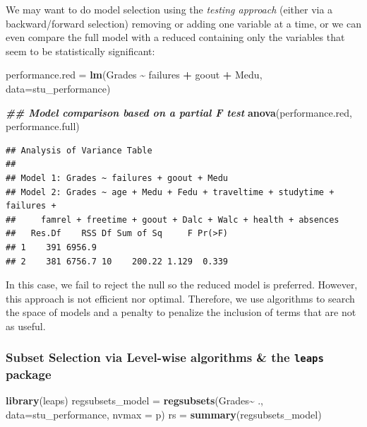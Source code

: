 \documentclass[
]{book}
\newenvironment{Shaded}{\begin{snugshade}}{\end{snugshade}}
\newcommand{\AttributeTok}[1]{\textcolor[rgb]{0.13,0.29,0.53}{#1}}
\newcommand{\DocumentationTok}[1]{\textcolor[rgb]{0.56,0.35,0.01}{\textbf{\textit{#1}}}}
\newcommand{\FunctionTok}[1]{\textcolor[rgb]{0.13,0.29,0.53}{\textbf{#1}}}
\newcommand{\NormalTok}[1]{#1}
\newcommand{\OtherTok}[1]{\textcolor[rgb]{0.56,0.35,0.01}{#1}}
\newcommand{\SpecialCharTok}[1]{\textcolor[rgb]{0.81,0.36,0.00}{\textbf{#1}}}
\begin{document}
We may want to do model selection using the \emph{testing approach} (either via a backward/forward selection) removing or adding one variable at a time, or we can even compare the full model with a reduced containing only the variables that seem to be statistically significant:

\begin{Shaded}
\begin{Highlighting}[]
\NormalTok{performance.red }\OtherTok{=} \FunctionTok{lm}\NormalTok{(Grades }\SpecialCharTok{\textasciitilde{}}\NormalTok{ failures }\SpecialCharTok{+}\NormalTok{ goout }\SpecialCharTok{+}\NormalTok{ Medu, }\AttributeTok{data=}\NormalTok{stu\_performance)}

\DocumentationTok{\#\# Model comparison based on a partial F test}
\FunctionTok{anova}\NormalTok{(performance.red, performance.full)}
\end{Highlighting}
\end{Shaded}

\begin{verbatim}
## Analysis of Variance Table
## 
## Model 1: Grades ~ failures + goout + Medu
## Model 2: Grades ~ age + Medu + Fedu + traveltime + studytime + failures + 
##     famrel + freetime + goout + Dalc + Walc + health + absences
##   Res.Df    RSS Df Sum of Sq     F Pr(>F)
## 1    391 6956.9                          
## 2    381 6756.7 10    200.22 1.129  0.339
\end{verbatim}

In this case, we fail to reject the null so the reduced model is preferred. However, this approach is not efficient nor optimal. Therefore, we use algorithms to search the space of models and a penalty to penalize the inclusion of terms that are not as useful.

\subsubsection{\texorpdfstring{Subset Selection via Level-wise algorithms \& the \texttt{leaps} package}{Subset Selection via Level-wise algorithms \& the leaps package}}\label{subset-selection-via-level-wise-algorithms-the-leaps-package}

\begin{Shaded}
\begin{Highlighting}[]
\FunctionTok{library}\NormalTok{(leaps)}
\NormalTok{regsubsets\_model }\OtherTok{=} \FunctionTok{regsubsets}\NormalTok{(Grades}\SpecialCharTok{\textasciitilde{}}\NormalTok{ ., }\AttributeTok{data=}\NormalTok{stu\_performance, }\AttributeTok{nvmax =}\NormalTok{ p)}
\NormalTok{rs }\OtherTok{=} \FunctionTok{summary}\NormalTok{(regsubsets\_model)}
\end{Highlighting}
\end{Shaded}
\end{document}
